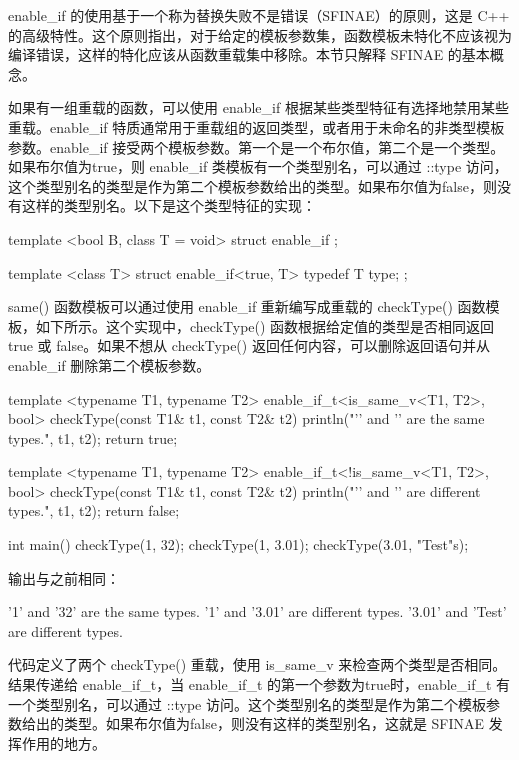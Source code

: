 
enable\_if 的使用基于一个称为替换失败不是错误（SFINAE）的原则，这是 C++ 的高级特性。这个原则指出，对于给定的模板参数集，函数模板未特化不应该视为编译错误，这样的特化应该从函数重载集中移除。本节只解释 SFINAE 的基本概念。

如果有一组重载的函数，可以使用 enable\_if 根据某些类型特征有选择地禁用某些重载。enable\_if 特质通常用于重载组的返回类型，或者用于未命名的非类型模板参数。enable\_if 接受两个模板参数。第一个是一个布尔值，第二个是一个类型。如果布尔值为true，则 enable\_if 类模板有一个类型别名，可以通过 ::type 访问，这个类型别名的类型是作为第二个模板参数给出的类型。如果布尔值为false，则没有这样的类型别名。以下是这个类型特征的实现：

\begin{cpp}
template <bool B, class T = void>
struct enable_if {};

template <class T>
struct enable_if<true, T> { typedef T type; };
\end{cpp}

same() 函数模板可以通过使用 enable\_if 重新编写成重载的 checkType() 函数模板，如下所示。这个实现中，checkType() 函数根据给定值的类型是否相同返回 true 或 false。如果不想从 checkType() 返回任何内容，可以删除返回语句并从 enable\_if 删除第二个模板参数。

\begin{cpp}
template <typename T1, typename T2>
enable_if_t<is_same_v<T1, T2>, bool>
checkType(const T1& t1, const T2& t2)
{
    println("'{}' and '{}' are the same types.", t1, t2);
    return true;
}

template <typename T1, typename T2>
enable_if_t<!is_same_v<T1, T2>, bool>
checkType(const T1& t1, const T2& t2)
{
    println("'{}' and '{}' are different types.", t1, t2);
    return false;
}

int main()
{
    checkType(1, 32);
    checkType(1, 3.01);
    checkType(3.01, "Test"s);
}
\end{cpp}

输出与之前相同：

\begin{shell}
'1' and '32' are the same types.
'1' and '3.01' are different types.
'3.01' and 'Test' are different types.
\end{shell}

代码定义了两个 checkType() 重载，使用 is\_same\_v 来检查两个类型是否相同。结果传递给 enable\_if\_t，当 enable\_if\_t 的第一个参数为true时，enable\_if\_t 有一个类型别名，可以通过 ::type 访问。这个类型别名的类型是作为第二个模板参数给出的类型。如果布尔值为false，则没有这样的类型别名，这就是 SFINAE 发挥作用的地方。

